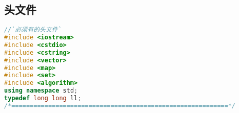 ﻿\subsection{头文件}
    \begin{lstlisting}[language=C++]
//`必须有的头文件`
#include <iostream>
#include <cstdio>
#include <cstring>
#include <vector>
#include <map>
#include <set>
#include <algorithm>
using namespace std;
typedef long long ll;
/*===========================================================*/
\end{lstlisting}
